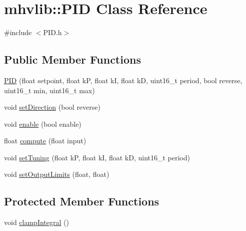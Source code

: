 \hypertarget{classmhvlib_1_1_p_i_d}{\section{mhvlib\-:\-:P\-I\-D Class Reference}
\label{classmhvlib_1_1_p_i_d}
}


{\ttfamily \#include $<$P\-I\-D.\-h$>$}

\subsection*{Public Member Functions}
\begin{DoxyCompactItemize}
\item 
\hyperlink{classmhvlib_1_1_p_i_d_a6dbbc68bdb97abca87469e0c19552dc4}{P\-I\-D} (float setpoint, float k\-P, float k\-I, float k\-D, uint16\-\_\-t period, bool reverse, uint16\-\_\-t min, uint16\-\_\-t max)
\item 
void \hyperlink{classmhvlib_1_1_p_i_d_a5e66a4eba89c47f4272495e2ae1d11d7}{set\-Direction} (bool reverse)
\item 
void \hyperlink{classmhvlib_1_1_p_i_d_ac8e574e52810bfdf5fcc2fd9c38e901a}{enable} (bool enable)
\item 
float \hyperlink{classmhvlib_1_1_p_i_d_ac7a6acd5776868bf4485271fb8c98ebd}{compute} (float input)
\item 
void \hyperlink{classmhvlib_1_1_p_i_d_a0a63f3d2b28e739d29345f64e454fe4c}{set\-Tuning} (float k\-P, float k\-I, float k\-D, uint16\-\_\-t period)
\item 
void \hyperlink{classmhvlib_1_1_p_i_d_ae4b9310d17b344ea2b449e71e6a7252b}{set\-Output\-Limits} (float, float)
\end{DoxyCompactItemize}
\subsection*{Protected Member Functions}
\begin{DoxyCompactItemize}
\item 
void \hyperlink{classmhvlib_1_1_p_i_d_a834fdda3492f2d3e4bd8a204c6dfa555}{clamp\-Integral} ()
\end{DoxyCompactItemize}
